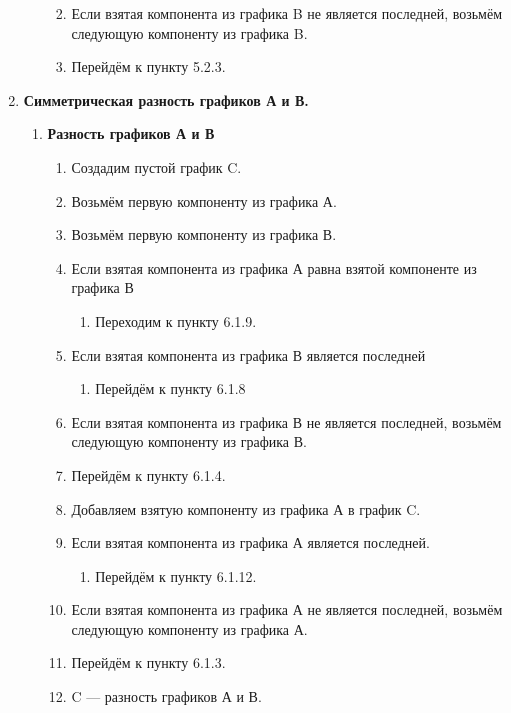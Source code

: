 \documentclass[a4paper,12pt]{extarticle}
\begin{document}
\begin{enumerate}
\begin{enumerate}[label*=\arabic*.]
\begin{enumerate}[label*=\arabic*.]
\begin{enumerate}[label*=\arabic*.]
    \end{enumerate}
    \item Если взятая компонента из графика B не является последней, возьмём следующую компоненту из графика B.
    \item Перейдём к пункту 5.2.3.
  \end{enumerate}
  \end{enumerate}
  \item \textbf{Симметрическая разность графиков А и В.}
  \begin{enumerate}[label*=\arabic*.]
    \item \textbf{Разность графиков А и В}
    \begin{enumerate}[label*=\arabic*.]
      \item Создадим пустой график C.
      \item Возьмём первую компоненту из графика А.
      \item Возьмём первую компоненту из графика В.
      \item Если взятая компонента из графика А равна взятой компоненте из графика В
      \begin{enumerate}[label*=\arabic*.]
        \item Переходим к пункту 6.1.9.
      \end{enumerate}
      \item Если взятая компонента из графика В является последней
      \begin{enumerate}[label*=\arabic*.]
        \item Перейдём к пункту 6.1.8
      \end{enumerate}
      \item Если взятая компонента из графика В не является последней, возьмём следующую компоненту из графика В.
      \item Перейдём к пункту 6.1.4.
      \item Добавляем взятую компоненту из графика А в график C.
      \item Если взятая компонента из графика А является последней.
      \begin{enumerate}[label*=\arabic*.]
        \item Перейдём к пункту 6.1.12.
      \end{enumerate}
      \item Если взятая компонента из графика А не является последней, возьмём следующую компоненту из графика А.
      \item Перейдём к пункту 6.1.3.
      \item C — разность графиков А и В.

\end{enumerate}
\end{enumerate}
\end{enumerate}
\end{document}

